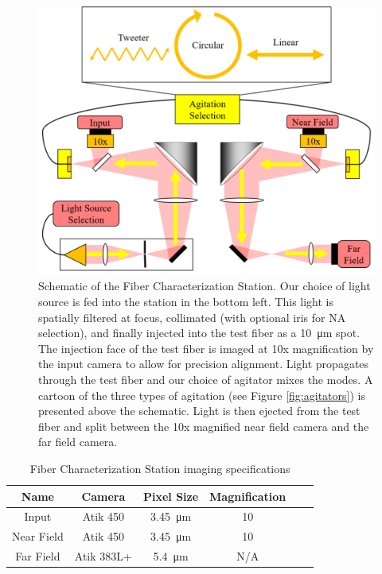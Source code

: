 \documentclass[twocolumn]{emulateapj}
\begin{document}
\begin{figure}
\centering
	\includegraphics[width=\columnwidth]{fcs_schematic.pdf}
	\caption{Schematic of the Fiber Characterization Station. Our choice of light source is fed into the station in the bottom left. This light is spatially filtered at focus, collimated (with optional iris for NA selection), and finally injected into the test fiber as a \SI{10}{\micro\meter} spot. The injection face of the test fiber is imaged at 10x magnification by the input camera to allow for precision alignment. Light propagates through the test fiber and our choice of agitator mixes the modes. A cartoon of the three types of agitation (see Figure \ref{fig:agitators}) is presented above the schematic. Light is then ejected from the test fiber and split between the 10x magnified near field camera and the far field camera.}
\label{fig:fcs}
\end{figure}

\begin{table}
\centering
\caption{Fiber Characterization Station imaging specifications}
	\begin{tabular}{cccccc}
	\hline
	Name & Camera & Pixel Size & Magnification \\
	\hline \hline
	Input & Atik 450 & \SI{3.45}{\micro\meter} & 10 \\
	\hline
	Near Field & Atik 450 & \SI{3.45}{\micro\meter} & 10 \\
	\hline
	Far Field & Atik 383L+ & \SI{5.4}{\micro\meter} & N/A \\
	\hline	
	\end{tabular}
\label{table:cameras}
\end{table}
\end{document}
